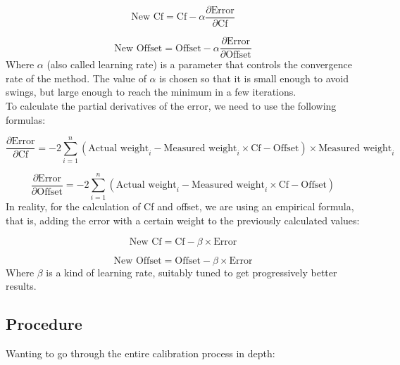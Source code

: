 \[
\text{New Cf} = \text{Cf} - \alpha \frac{\partial \text{Error}}{\partial \text{Cf}}
\]

\[
\text{New Offset} = \text{Offset} - \alpha \frac{\partial \text{Error}}{\partial \text{Offset}}
\]
\noindent
Where $\alpha$ (also called learning rate) is a parameter that controls the convergence rate of the method. The value of $\alpha$ is chosen so that it is small enough to avoid swings, but large enough to reach the minimum in a few iterations.\\
To calculate the partial derivatives of the error, we need to use the following formulas:

\[
\frac{\partial \text{Error}}{\partial \text{Cf}} = -2 \sum_{i=1}^{n} (\text{Actual weight}_i - \text{Measured weight}_i \times \text{Cf} - \text{Offset}) \times \text{Measured weight}_i
\]

\[
\frac{\partial \text{Error}}{\partial \text{Offset}} = -2 \sum_{i=1}^{n} (\text{Actual weight}_i - \text{Measured weight}_i \times \text{Cf} - \text{Offset})
\]
\noindent
In reality, for the calculation of Cf and offset, we are using an empirical formula, that is, adding the error with a certain weight to the previously calculated values:

\[
\text{New Cf} = \text{Cf} - \beta \times \text{Error}
\]

\[
\text{New Offset} = \text{Offset} - \beta \times \text{Error}
\]
\noindent
Where $\beta$ is a kind of learning rate, suitably tuned to get progressively better results.

\subsection{Procedure}

Wanting to go through the entire calibration process in depth:

